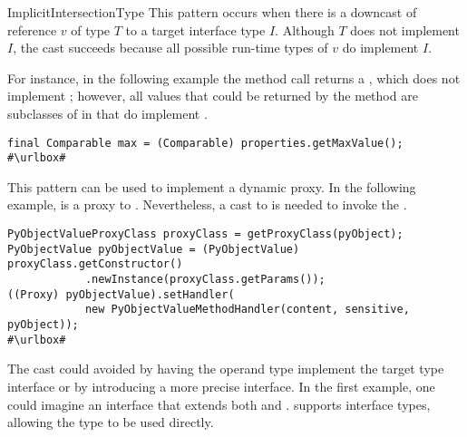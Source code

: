 \begin{pattern}{ImplicitIntersectionType}
This pattern occurs when there is a downcast of reference $v$ of type $T$ to a target interface type $I$.
Although $T$ does not implement $I$, 
the cast succeeds because all possible run-time types of $v$ do implement $I$.

\instances{}
For instance, in the following example the method call returns a ,
which does not implement ; however,
all values that could be returned by the method are subclasses of 
in  that do implement .

\def\urlvar{http://bit.ly/senbox_org_snap_desktop_2FQOt4v}
\begin{verbatim}
final Comparable max = (Comparable) properties.getMaxValue();
#\urlbox#
\end{verbatim}

This pattern can be used to implement a dynamic proxy.
In the following example,
 is a proxy to .
Nevertheless, a cast to  is needed to invoke the .

\def\urlvar{http://bit.ly/CloudSlang_cloud_slang_2EkgP4l}
\begin{verbatim}
PyObjectValueProxyClass proxyClass = getProxyClass(pyObject);
PyObjectValue pyObjectValue = (PyObjectValue) proxyClass.getConstructor()
            .newInstance(proxyClass.getParams());
((Proxy) pyObjectValue).setHandler(
            new PyObjectValueMethodHandler(content, sensitive, pyObject));
#\urlbox#
\end{verbatim}

\issues{}
The cast could avoided by having the operand type implement the target type
interface or by introducing a more precise interface.
In the first example,
one could imagine an interface  that extends both
 and .
\scala{} supports interface types,
allowing the type  to be used directly.

\end{pattern}